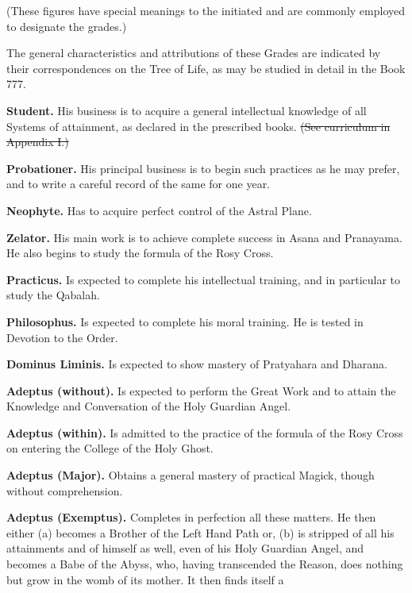(These figures have special meanings to the initiated and are commonly employed to designate the grades.)

The general characteristics and attributions of these Grades are indicated by their correspondences on the Tree of Life, as may be studied in detail in the Book 777.

\textbf{Student.} \textemdash{} His business is to acquire a general intellectual knowledge of all Systems of attainment, as declared in the prescribed books. \sout{(See curriculum in Appendix I.)}

\textbf{Probationer.} \textemdash{} His principal business is to begin such practices as he may prefer, and to write a careful record of the same for one year.

\textbf{Neophyte.} \textemdash{} Has to acquire perfect control of the Astral Plane.

\textbf{Zelator.} \textemdash{} His main work is to achieve complete success in Asana and Pranayama. He also begins to study the formula of the Rosy Cross.

\textbf{Practicus.} \textemdash{} Is expected to complete his intellectual training, and in particular to study the Qabalah.

\textbf{Philosophus.} \textemdash{} Is expected to complete his moral training. He is tested in Devotion to the Order.

\textbf{Dominus Liminis.} \textemdash{} Is expected to show mastery of Pratyahara and Dharana.

\textbf{Adeptus (without).} \textemdash{} Is expected to perform the Great Work and to attain the Knowledge and Conversation of the Holy Guardian Angel.

\textbf{Adeptus (within).} \textemdash{} Is admitted to the practice of the formula of the Rosy Cross on entering the College of the Holy Ghost.

\textbf{Adeptus (Major).} \textemdash{} Obtains a general mastery of practical Magick, though without comprehension.

\textbf{Adeptus (Exemptus).} \textemdash{} Completes in perfection all these matters. He then either (a) becomes a Brother of the Left Hand Path or, (b)  is stripped of all his attainments and of himself as well, even of his Holy Guardian Angel, and becomes a Babe of the Abyss, who, having transcended the Reason, does nothing but grow in the womb of its mother. It then finds itself a

